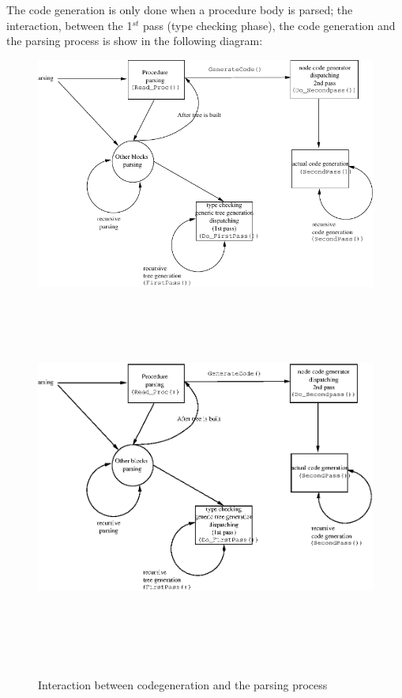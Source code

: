\documentclass [a4paper,12pt]{article}
\begin{document}
The code generation is only done when a procedure body is parsed; the
interaction, between the 1$^{st}$ pass (type checking phase), the code
generation and the parsing process is show in the following diagram:

\begin{figure}
\ifpdf
\includegraphics{arch10.pdf}
\else
\includegraphics[width=6.95in,height=4.90in]{arch10.eps}
\fi
\label{fig:fig10}
\caption{Interaction between codegeneration and the parsing process}
\end{figure}
\end{document}
